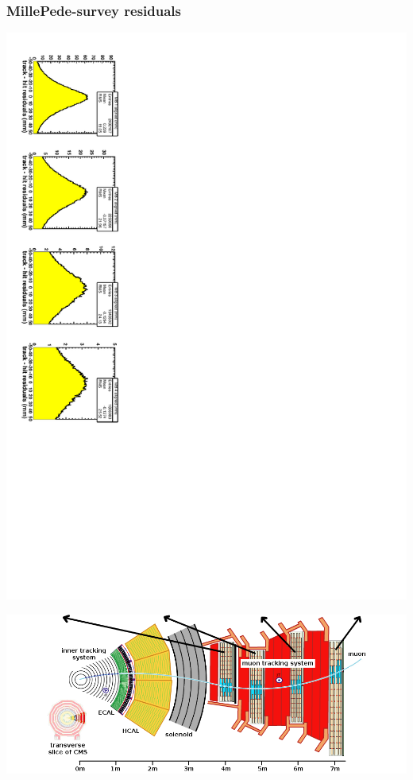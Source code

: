 \documentclass[compress]{beamer}
\begin{document}
\begin{frame}
\frametitle{MillePede-survey residuals}

\includegraphics[height=\linewidth, angle=90]{S43_plots/RestrictPT10_MuonPT5_barrelresid.pdf}

\includegraphics[width=\linewidth]{cms_slice.png}
\end{frame}


\end{document}
